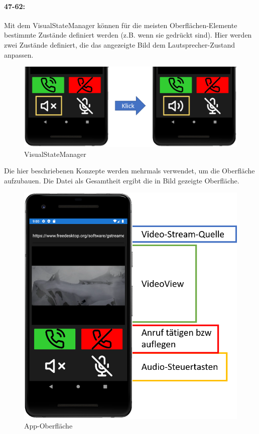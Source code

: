 \paragraph{47-62:} Mit dem VisualStateManager können für die meisten Oberflächen-Elemente bestimmte Zustände definiert werden (z.B. wenn sie gedrückt sind). Hier werden zwei Zustände definiert, die das angezeigte Bild dem Lautsprecher-Zustand anpassen.
\begin{figure}[H]
    \centering\includegraphics[width=.9\linewidth]{images/xamarin/VisualStateManager.png}
    \caption{VisualStateManager}
\end{figure}
Die hier beschriebenen Konzepte werden mehrmals verwendet, um die Oberfläche aufzubauen. Die Datei als Gesamtheit ergibt die in Bild  gezeigte Oberfläche.
\begin{figure}[H]
    \centering\includegraphics[width=.9\linewidth]{images/xamarin/MainPage.png}
    \caption{App-Oberfläche}
    \label{fig:mainpage}
\end{figure}

